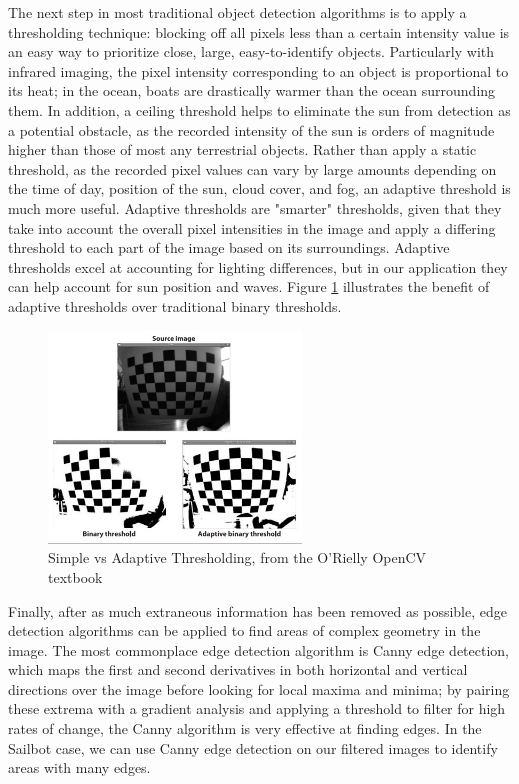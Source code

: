 The next step in most traditional object detection algorithms is to apply a thresholding technique: blocking off all pixels less than a certain intensity value is an easy way to prioritize close, large, easy-to-identify objects. Particularly with infrared imaging, the pixel intensity corresponding to an object is proportional to its heat; in the ocean, boats are drastically warmer than the ocean surrounding them. In addition, a ceiling threshold helps to eliminate the sun from detection as a potential obstacle, as the recorded intensity of the sun is orders of magnitude higher than those of most any terrestrial objects. Rather than apply a static threshold, as the recorded pixel values can vary by large amounts depending on the time of day, position of the sun, cloud cover, and fog, an adaptive threshold is much more useful. Adaptive thresholds are "smarter" thresholds, given that they take into account the overall pixel intensities in the image and apply a differing threshold to each part of the image based on its surroundings. Adaptive thresholds excel at accounting for lighting differences, but in our application they can help account for sun position and waves. Figure \ref{fig:thresh_comp} illustrates the benefit of adaptive thresholds over traditional binary thresholds.

\begin{figure}[h]
\centering
\includegraphics[width=0.6\textwidth]{"./image/threshold_comparisons"}
\caption{Simple vs Adaptive Thresholding, from the O'Rielly OpenCV textbook}
\label{fig:thresh_comp}
\end{figure}

Finally, after as much extraneous information has been removed as possible, edge detection algorithms can be applied to find areas of complex geometry in the image. The most commonplace edge detection algorithm is Canny edge detection, which maps the first and second derivatives in both horizontal and vertical directions over the image before looking for local maxima and minima; by pairing these extrema with a gradient analysis and applying a threshold to filter for high rates of change, the Canny algorithm is very effective at finding edges. In the Sailbot case, we can use Canny edge detection on our filtered images to identify areas with many edges. 


